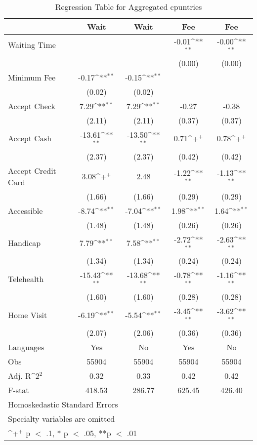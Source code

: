 \begin{table}[]
\caption{Regression Table for Aggregated cpuntries}
{
\def\sym#1{\ifmmode^{#1}\else\(^{#1}\)\fi}
\begin{tabular}{@{\extracolsep{2pt}}l*{4}{c}@{}}
\hline\hline


 & Wait & Wait & Fee & Fee \\
\hline
Waiting Time &  &  & -0.01\sym{**} & -0.00\sym{**} \\
 &  &  & (0.00) & (0.00) \\
Minimum Fee & -0.17\sym{**} & -0.15\sym{**} &  &  \\
 & (0.02) & (0.02) &  &  \\
Accept Check & 7.29\sym{**} & 7.29\sym{**} & -0.27 & -0.38 \\
 & (2.11) & (2.11) & (0.37) & (0.37) \\
Accept Cash & -13.61\sym{**} & -13.50\sym{**} & 0.71\sym{+} & 0.78\sym{+} \\
 & (2.37) & (2.37) & (0.42) & (0.42) \\
Accept Credit Card & 3.08\sym{+} & 2.48 & -1.22\sym{**} & -1.13\sym{**} \\
 & (1.66) & (1.66) & (0.29) & (0.29) \\
Accessible & -8.74\sym{**} & -7.04\sym{**} & 1.98\sym{**} & 1.64\sym{**} \\
 & (1.48) & (1.48) & (0.26) & (0.26) \\
Handicap & 7.79\sym{**} & 7.58\sym{**} & -2.72\sym{**} & -2.63\sym{**} \\
 & (1.34) & (1.34) & (0.24) & (0.24) \\
Telehealth & -15.43\sym{**} & -13.68\sym{**} & -0.78\sym{**} & -1.16\sym{**} \\
 & (1.60) & (1.60) & (0.28) & (0.28) \\
Home Visit & -6.19\sym{**} & -5.54\sym{**} & -3.45\sym{**} & -3.62\sym{**} \\
 & (2.07) & (2.06) & (0.36) & (0.36) \\
Languages & Yes & No & Yes & No \\

\hline
Obs & 55904 & 55904 & 55904 & 55904 \\
Adj. R\sym{2} & 0.32 & 0.33 & 0.42 & 0.42 \\
F-stat & 418.53 & 286.77 & 625.45 & 426.40 \\
\hline\hline
\multicolumn{5}{l}{\footnotesize Homoskedastic Standard Errors}\vspace{-.25em} \\
\multicolumn{5}{l}{\footnotesize Specialty variables are omitted}\vspace{-.25em} \\
\multicolumn{5}{l}{\footnotesize \sym{+} p $<$ .1, * p $<$ .05, **p $<$ .01}
\end{tabular}
}
\end{table}